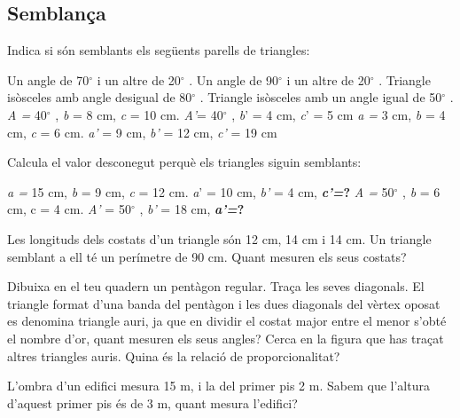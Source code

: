 \begin{activitats}


\subsection{Semblança}
\begin{mylist}
\exer  Indica si són semblants els següents parells de triangles:

\begin{tasks}
	\task  Un angle de 70${}^\circ$  i un altre de 20${}^\circ$ . Un angle de 90${}^\circ$  i un altre de 20${}^\circ$ . 
	\task  Triangle isòsceles amb angle desigual de 80${}^\circ$ . Triangle isòsceles amb un angle igual de 50${}^\circ$ .
	\task  \textit{A =} 40${}^\circ$ , \textit{b} = 8 cm, \textit{c} = 10 cm. \textit{A'}= 40${}^\circ$ , \textit{b}' = 4 cm, \textit{c}' = 5 cm
	\task  \textit{a =} 3 cm, \textit{b} = 4 cm, \textit{c} = 6 cm. \textit{a'} = 9 cm, \textit{b'} = 12 cm, \textit{c'} = 19 cm 
\end{tasks}

\answers[cols=2]{[Sí, Sí, Sí, No]}

\exer  Calcula el valor desconegut perquè els triangles siguin semblants:

\begin{tasks}
	\task  \textit{a =} 15 cm, \textit{b} = 9 cm, \textit{c} = 12 cm. \textit{a}' = 10 cm, \textit{b'} = 4 cm, \textbf{\textit{c'=}?}
	\task  \textit{A =} 50${}^\circ$ , \textit{b} = 6 cm, c = 4 cm. \textit{A'} = 50${}^\circ$ , \textit{b'} = 18 cm, \textbf{\textit{a'=}?}
\end{tasks}
\answers[cols=1]{[No es pot trobar $c'$ perquè no són semblants $\frac{15}{10}\neq \frac{9}{4}$, $a'=12$ cm]}


\exer  Les longituds dels costats d'un triangle són 12 cm, 14 cm i 14 cm. Un triangle semblant a ell té un perímetre de 90 cm. Quant mesuren els seus costats?

\exer  Dibuixa en el teu quadern un pentàgon regular. Traça les seves diagonals. El triangle format d'una banda del pentàgon i les dues diagonals del vèrtex oposat es denomina triangle auri, ja que en dividir el costat major entre el menor s'obté el nombre d'or, quant mesuren els seus angles? Cerca en la figura que has traçat altres triangles auris. Quina és la relació de proporcionalitat? 

\exer  L'ombra d'un edifici mesura 15 m, i la del primer pis 2 m. Sabem que l'altura d'aquest primer pis és de 3 m, quant mesura l'edifici?
 

\end{mylist}
\end{activitats}
